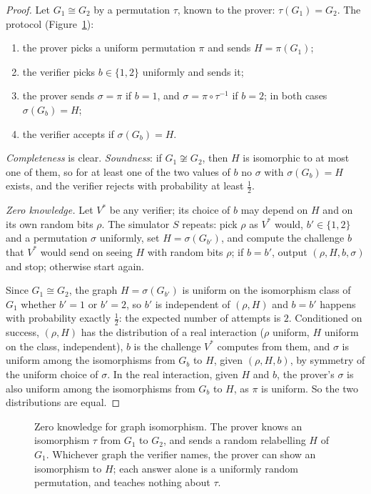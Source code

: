 \begin{proof}
Let $G_1\cong G_2$ by a permutation $\tau$, known to the prover: $\tau(G_1)=G_2$. The protocol (Figure~\ref{fig:gi}):
\begin{enumerate}
\item the prover picks a uniform permutation $\pi$ and sends $H=\pi(G_1)$;
\item the verifier picks $b\in\{1,2\}$ uniformly and sends it;
\item the prover sends $\sigma=\pi$ if $b=1$, and $\sigma=\pi\circ\tau^{-1}$ if $b=2$; in both cases $\sigma(G_b)=H$;
\item the verifier accepts if $\sigma(G_b)=H$.
\end{enumerate}
\emph{Completeness} is clear. \emph{Soundness}: if $G_1\not\cong G_2$, then $H$ is isomorphic to at most one of them, so for at least one of the two values of $b$ no $\sigma$ with $\sigma(G_b)=H$ exists, and the verifier rejects with probability at least $\frac12$.

\emph{Zero knowledge.} Let $V^*$ be any verifier; its choice of $b$ may depend on $H$ and on its own random bits $\rho$. The simulator $S$ repeats: pick $\rho$ as $V^*$ would, $b'\in\{1,2\}$ and a permutation $\sigma$ uniformly, set $H=\sigma(G_{b'})$, and compute the challenge $b$ that $V^*$ would send on seeing $H$ with random bits $\rho$; if $b=b'$, output $(\rho,H,b,\sigma)$ and stop; otherwise start again.

Since $G_1\cong G_2$, the graph $H=\sigma(G_{b'})$ is uniform on the isomorphism class of $G_1$ whether $b'=1$ or $b'=2$, so $b'$ is independent of $(\rho,H)$ and $b=b'$ happens with probability exactly $\frac12$: the expected number of attempts is $2$. Conditioned on success, $(\rho,H)$ has the distribution of a real interaction ($\rho$ uniform, $H$ uniform on the class, independent), $b$ is the challenge $V^*$ computes from them, and $\sigma$ is uniform among the isomorphisms from $G_b$ to $H$, given $(\rho,H,b)$, by symmetry of the uniform choice of $\sigma$. In the real interaction, given $H$ and $b$, the prover's $\sigma$ is also uniform among the isomorphisms from $G_b$ to $H$, as $\pi$ is uniform. So the two distributions are equal.
\end{proof}

\begin{figure}[ht]
\centering
{}
\caption{Zero knowledge for graph isomorphism. The prover knows an isomorphism $\tau$ from $G_1$ to $G_2$, and sends a random relabelling $H$ of $G_1$. Whichever graph the verifier names, the prover can show an isomorphism to $H$; each answer alone is a uniformly random permutation, and teaches nothing about $\tau$.}
\label{fig:gi}
\end{figure}

